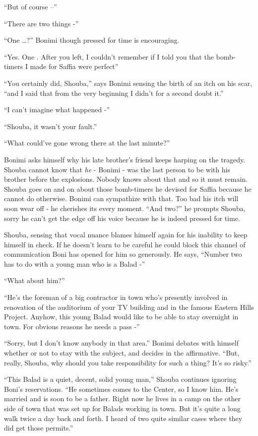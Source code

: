 \documentclass[twoside,11pt]{book}
\begin{document}
``But of course --''

``There are two things -''

``One {\dots}?'' Bonimi though pressed for time is encouraging.

``Yes. One . After you left, I couldn't remember if I told you that the bomb-timers I made for Saffia
were perfect''

``You certainly did, Shouba,'' says Bonimi sensing the birth of an itch on his scar,
``and I said that from the very beginning I didn't for a second doubt it.''

``I can't imagine what happened -''

``Shouba, it wasn't your fault.''

``What could've gone wrong there at the last minute?''

Bonimi asks himself why his late brother's friend keeps harping on the tragedy. Shouba cannot know that \textit{he} -
Bonimi - was the last person to be with his brother before the explosions. Nobody knows about that and so it must
remain. Shouba  goes on and on about those bomb-timers he devised for Saffia because he cannot do otherwise. Bonimi can
sympathize with that. Too bad his itch will soon wear off - he cherishes its every moment.  ``And
two?'' he prompts Shouba, sorry he can't get the edge off his voice because he is indeed pressed for
time.

Shouba, sensing that vocal nuance blames himself again for his inability to keep himself in check. If he doesn't learn
to be careful he could block this channel of communication Boni has opened for him so generously. He says,
``Number two has to do with a young man who is a Balad -''

``What about him?''

``He's the foreman of a big contractor in town who's presently involved in renovation of the auditorium of
your TV building and in the famous Eastern Hills Project. Anyhow, this young Balad would like to be able to stay
overnight in town. For obvious reasons he needs a pass -''

``Sorry, but I don't know anybody in that area.'' Bonimi debates with himself whether or not
to stay with the subject, and decides in the affirmative. ``But, really, Shouba, why should you take
responsibility for such a thing? It's so risky.''

``This Balad is a quiet, decent, solid young man,'' Shouba continues ignoring Boni's
reservations. ``He sometimes comes to the Center, so I know him. He's married and is soon to be a father.
Right now he lives in a camp on the other side of town that was set up for Balads working in town. But it's quite a
long walk twice a day back and forth. I heard of two quite similar cases where they did get those
permits.''
\end{document}
